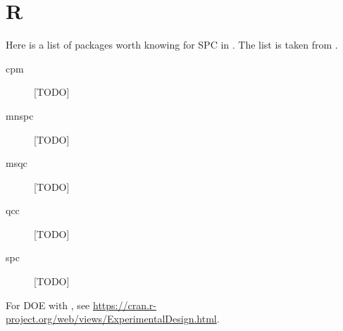 


\chapter{R}
\label{apx:r}

Here is a list of packages worth knowing for SPC in \R.
The list is taken from \cite{qiu_introduction_2013}. 

\begin{description}
\item [cpm] [TODO]
\item [mnspc] [TODO]
\item [msqc] [TODO]
\item [qcc] [TODO]
\item [spc] [TODO]
\end{description}

For DOE with \R, see \url{https://cran.r-project.org/web/views/ExperimentalDesign.html}.
